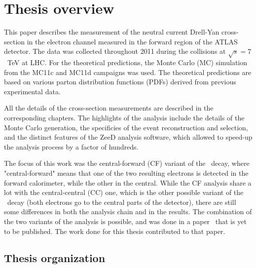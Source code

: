 \chapter{Thesis overview}
\label{sec:TOverview}

This paper describes the measurement of the neutral current Drell-Yan cross-section in the electron channel measured in the forward region of the ATLAS detector. The data was collected throughout 2011 during the collisions at $\sqrt{s} = 7$~TeV at LHC. For the theoretical predictions, the Monte Carlo (MC) simulation from the MC11c and MC11d campaigns was used. The theoretical predictions are based on various parton distribution functions (PDFs) derived from previous experimental data.

All the details of the cross-section measurements are described in the corresponding chapters. The highlights of the analysis include the details of the Monte Carlo generation, the specificies of the event reconstruction and selection, and the distinct features of the ZeeD analysis software, which allowed to speed-up the analysis process by a factor of hundreds.

The focus of this work was the central-forward (CF) variant of the \Zee\ decay, where "central-forward" means that one of the two resulting electrons is detected in the forward calorimeter, while the other in the central. While the CF analysis share a lot with the central-central (CC) one, which is the other possible variant of the \Zee\ decay (both electrons go to the central parts of the detector), there are still some differences in both the analysis chain and in the results. The combination of the two variants of the analysis is possible, and was done in a paper~\cite{lib:wz2011} that is yet to be published. The work done for this thesis contributed to that paper.


\section{Thesis organization}
\label{sec:TOrganization}

